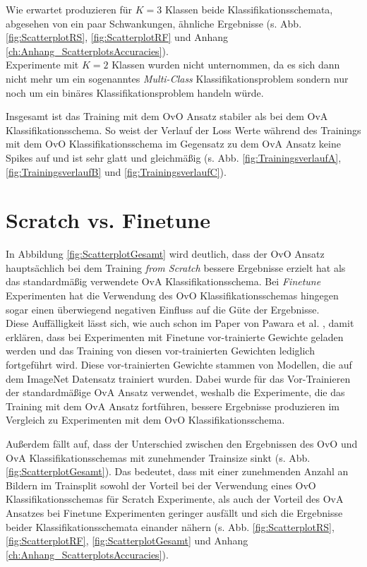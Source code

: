 Wie erwartet produzieren für $K=3$ Klassen beide Klassifikationsschemata, abgesehen von ein paar Schwankungen, ähnliche Ergebnisse (s. Abb. \ref{fig:ScatterplotRS}, \ref{fig:ScatterplotRF} und Anhang \ref{ch:Anhang_ScatterplotsAccuracies}). \\


Experimente mit $K=2$ Klassen wurden nicht unternommen, da es sich dann nicht mehr um ein sogenanntes \textit{Multi-Class} Klassifikationsproblem sondern nur noch um ein binäres Klassifikationsproblem handeln würde.

Insgesamt ist das Training mit dem OvO Ansatz stabiler als bei dem OvA Klassifikationsschema. So weist der Verlauf der Loss Werte während des Trainings mit dem OvO Klassifikationsschema im Gegensatz zu dem OvA Ansatz keine Spikes auf und ist sehr glatt und gleichmäßig (s. Abb. \ref{fig:TrainingsverlaufA}, \ref{fig:TrainingsverlaufB} und \ref{fig:TrainingsverlaufC}).

\section{Scratch vs. Finetune}
\label{ch:diskussionSvsF}
In Abbildung \ref{fig:ScatterplotGesamt} wird deutlich, dass der OvO Ansatz hauptsächlich bei dem Training \textit{from Scratch} bessere Ergebnisse erzielt hat als das standardmäßig verwendete OvA Klassifikationsschema. Bei \textit{Finetune} Experimenten hat die Verwendung des OvO Klassifikationsschemas hingegen sogar einen überwiegend negativen Einfluss auf die Güte der Ergebnisse.\\


Diese Auffälligkeit lässt sich, wie auch schon im Paper von Pawara et al. \cite{pawaraPaper}, damit erklären, dass bei Experimenten mit Finetune vor-trainierte Gewichte geladen werden und das Training von diesen vor-trainierten Gewichten lediglich fortgeführt wird. Diese vor-trainierten Gewichte stammen von Modellen, die auf dem ImageNet \cite{imagenet} Datensatz trainiert wurden. Dabei wurde für das Vor-Trainieren der standardmäßige OvA Ansatz verwendet, weshalb die Experimente, die das Training mit dem OvA Ansatz fortführen, bessere Ergebnisse produzieren im Vergleich zu Experimenten mit dem OvO Klassifikationsschema.


Außerdem fällt auf, dass der Unterschied zwischen den Ergebnissen des OvO und OvA Klassifikationsschemas mit zunehmender Trainsize sinkt (s. Abb. \ref{fig:ScatterplotGesamt}). Das bedeutet, dass mit einer zunehmenden Anzahl an Bildern im Trainsplit sowohl der Vorteil bei der Verwendung eines OvO Klassifikationsschemas für Scratch Experimente, als auch der Vorteil des OvA Ansatzes bei Finetune Experimenten geringer ausfällt und sich die Ergebnisse beider Klassifikationsschemata einander nähern (s. Abb. \ref{fig:ScatterplotRS}, \ref{fig:ScatterplotRF}, \ref{fig:ScatterplotGesamt} und Anhang \ref{ch:Anhang_ScatterplotsAccuracies}).


